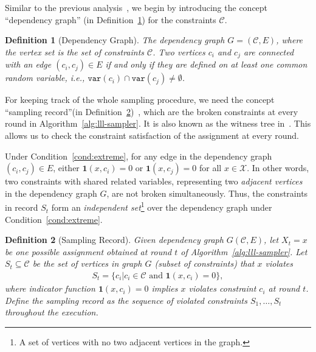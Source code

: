 \documentclass[letterpaper]{article} %
\newtheorem{definition}{Definition}
\newcommand{\var}{\mathtt{var}}
\begin{document}
Similar to the previous analysis~\cite{DBLP:journals/jacm/GuoJL19,DBLP:journals/arxiv/jerrum2021}, we begin by introducing the concept ``dependency graph'' (in Definition~\ref{def:dep-graph}) for the constraints $\mathcal{C}$. 

\begin{definition}[Dependency Graph] \label{def:dep-graph}
The dependency graph $G=(\mathcal{C},E)$, where the vertex set is the set of constraints $\mathcal{C}$.  Two vertices $c_i$ and $c_j$ are connected with an edge $(c_i,c_j)\in E$ if and only if they are defined on at least one common random variable, i.e., $\var(c_i)\cap\var(c_j) \neq \emptyset$. 
\end{definition}

For keeping track of the whole sampling procedure, we need the concept ``sampling record''(in Definition~\ref{def:record})~\cite{DBLP:journals/jacm/GuoJL19}, which are the broken constraints at every round in Algorithm~\ref{alg:lll-sampler}. It is also known as the witness tree in~\citet{DBLP:journals/jacm/MoserT10}.  This allows us to check the constraint satisfaction of the assignment at every round.

Under Condition~\ref{cond:extreme}, for any edge in the dependency graph $(c_i,c_j) \in E$,   either $\mathbf{1}(x,c_i)=0$ or $\mathbf{1}(x,c_j)=0$ for all $x\in \mathcal{X}$.
In other words, two constraints with shared related variables, representing two \textit{adjacent vertices} in the dependency graph $G$, are not broken simultaneously. Thus, the constraints in record $S_t$ form an \textit{independent set}\footnote{A set of vertices with no two adjacent vertices in the graph.} over the dependency graph under Condition~\ref{cond:extreme}.

\begin{definition}[Sampling Record] \label{def:record} 
Given dependency graph $G(\mathcal{C},E)$, let $X_t=x$ be  one possible assignment obtained at round $t$ of Algorithm~\ref{alg:lll-sampler}. Let $S_t\subseteq \mathcal{C}$ be the set of vertices in graph $G$ (subset of constraints) that $x$ violates
\begin{align}
    S_t = \{c_i|c_i\in \mathcal{C}\text{ and } \mathbf{1}(x,c_i)=0\},
\end{align}
where indicator function $\mathbf{1}(x,c_i)=0$ implies  $x$ violates constraint $c_i$  at round $t$.
Define the sampling record as the sequence of violated constraints  $S_1,\ldots,S_t$ throughout the execution.
\end{definition}
\end{document}
